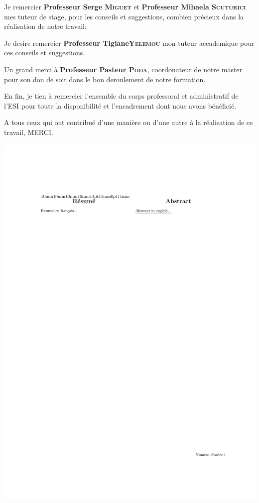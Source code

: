 {  
  Je remercier \textbf{Professeur Serge \textsc{Miguet}} et \textbf{Professeur Mihaela \textsc{Scuturici}}
    mes tuteur de stage, pour les conseils et suggestions, combien précieux dans la
    réalisation de notre travail;
  
  Je desire remercier \textbf{Professeur Tigiane\textsc{Yelemou}} mon tuteur accademique
  pour ces conseils et suggestions.
 
  Un grand merci à \textbf{Professeur Pasteur \textsc{Poda}}, coordonateur de notre master
    pour son don de soit dans le bon deroulement de notre formation.

  En fin, je tien à remercier l'ensemble du corps professoral et administratif de l'ESI  pour toute la
    disponibilité et l'encadrement dont nous avons bénéficié.
  
A tous ceux qui ont contribué d'une manière ou d'une autre à la réalisation de
ce travail, MERCI.

\thispagestyle{front}
}

\begin{center}
\includegraphics[width=\textwidth]{miscpages/resume.pdf}
\end{center}


